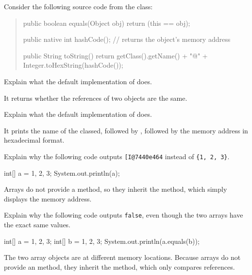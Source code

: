 
Consider the following source code from the  class:

\begin{quote}
\begin{javalst}
public boolean equals(Object obj) {
    return (this == obj);
}

public native int hashCode();  // returns the object's memory address

public String toString() {
    return getClass().getName() + "@" + Integer.toHexString(hashCode());
}
\end{javalst}
\end{quote}






\Q Explain what the default implementation of  does.

\begin{answer}[3em]
It returns whether the references of two objects are the same.
\end{answer}


\Q Explain what the default implementation of  does.

\begin{answer}[3em]
It prints the name of the classed, followed by , followed by the memory address in hexadecimal format.
\end{answer}


\Q Explain why the following code outputs \texttt{[I@7440e464} instead of \texttt{\{1, 2, 3\}}.

\begin{javalst}
int[] a = {1, 2, 3};
System.out.println(a);
\end{javalst}

\begin{answer}[3em]
Arrays do not provide a  method, so they inherit the  method, which simply displays the memory address.
\end{answer}


\Q Explain why the following code outputs \texttt{false}, even though the two arrays have the exact same values.

\begin{javalst}
int[] a = {1, 2, 3};
int[] b = {1, 2, 3};
System.out.println(a.equals(b));
\end{javalst}

\begin{answer}[3em]
The two array objects are at different memory locations.
Because arrays do not provide an  method, they inherit the  method, which only compares references.
\end{answer}
